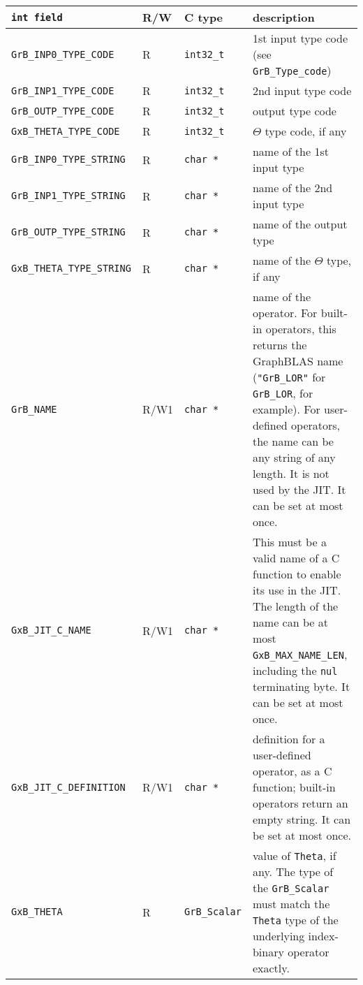 \noindent
{\small
\begin{tabular}{|l|l|l|p{2.8in}|}
\hline
\verb'int field'                    & R/W  & C type        & description \\
\hline
\verb'GrB_INP0_TYPE_CODE'          & R    & \verb'int32_t'& 1st input type code (see \verb'GrB_Type_code') \\
\verb'GrB_INP1_TYPE_CODE'          & R    & \verb'int32_t'& 2nd input type code \\
\verb'GrB_OUTP_TYPE_CODE'          & R    & \verb'int32_t'& output type code \\
\verb'GxB_THETA_TYPE_CODE'         & R    & \verb'int32_t'& $\Theta$ type code, if any \\
\verb'GrB_INP0_TYPE_STRING'        & R    & \verb'char *' & name of the 1st input type \\
\verb'GrB_INP1_TYPE_STRING'        & R    & \verb'char *' & name of the 2nd input type \\
\verb'GrB_OUTP_TYPE_STRING'        & R    & \verb'char *' & name of the output type \\
\verb'GxB_THETA_TYPE_STRING'       & R    & \verb'char *' & name of the $\Theta$ type, if any \\
\hline
\verb'GrB_NAME'                     & R/W1 & \verb'char *' &    %
    name of the operator.  For built-in operators, this returns the GraphBLAS
    name (\verb'"GrB_LOR"' for \verb'GrB_LOR', for example).
    For user-defined operators, the name can be any string of any length.  It
    is not used by the JIT.  It can be set at most once. \\
\verb'GxB_JIT_C_NAME'               & R/W1 & \verb'char *' &
    This must be a valid name of a C function to enable its use in the JIT.
    The length of the name can be at most \verb'GxB_MAX_NAME_LEN', including
    the \verb'nul' terminating byte.  It can be set at most once. \\
\verb'GxB_JIT_C_DEFINITION'         & R/W1 & \verb'char *' &
    definition for a user-defined operator, as a C function; built-in operators
    return an empty string.  It can be set at most once. \\
\verb'GxB_THETA' & R & \verb'GrB_Scalar' &
    value of \verb'Theta', if any.
    The type of the \verb'GrB_Scalar'
    must match the \verb'Theta' type of the underlying
    index-binary operator exactly. \\
\hline
\end{tabular}
}


